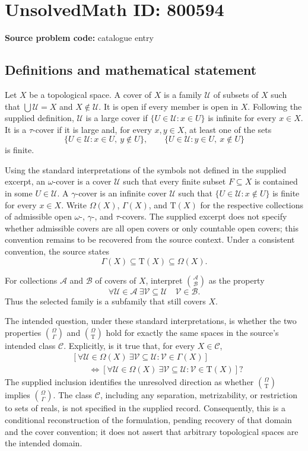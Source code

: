 \documentclass[11pt]{article}
\begin{document}
\section*{UnsolvedMath ID: 800594}
\textbf{Source problem code:} catalogue entry
\subsection{Definitions and mathematical statement}
Let \(X\) be a topological space. A cover of \(X\) is a family \(\mathcal U\) of subsets of \(X\) such that \(\bigcup\mathcal U=X\) and \(X\notin\mathcal U\). It is open if every member is open in \(X\). Following the supplied definition, \(\mathcal U\) is a large cover if \(\{U\in\mathcal U:x\in U\}\) is infinite for every \(x\in X\). It is a \(\tau\)-cover if it is large and, for every \(x,y\in X\), at least one of the sets
\[
\{U\in\mathcal U:x\in U,\ y\notin U\},\qquad
\{U\in\mathcal U:y\in U,\ x\notin U\}
\]
is finite.

Using the standard interpretations of the symbols not defined in the supplied excerpt, an \(\omega\)-cover is a cover \(\mathcal U\) such that every finite subset \(F\subseteq X\) is contained in some \(U\in\mathcal U\). A \(\gamma\)-cover is an infinite cover \(\mathcal U\) such that \(\{U\in\mathcal U:x\notin U\}\) is finite for every \(x\in X\). Write \(\Omega(X)\), \(\Gamma(X)\), and \(\mathrm T(X)\) for the respective collections of admissible open \(\omega\)-, \(\gamma\)-, and \(\tau\)-covers. The supplied excerpt does not specify whether admissible covers are all open covers or only countable open covers; this convention remains to be recovered from the source context. Under a consistent convention, the source states
\[
\Gamma(X)\subseteq\mathrm T(X)\subseteq\Omega(X).
\]

For collections \(\mathcal A\) and \(\mathcal B\) of covers of \(X\), interpret \(\binom{\mathcal A}{\mathcal B}\) as the property
\[
\forall\mathcal U\in\mathcal A\ \exists\mathcal V\subseteq\mathcal U
\quad \mathcal V\in\mathcal B.
\]
Thus the selected family is a subfamily that still covers \(X\).

The intended question, under these standard interpretations, is whether the two properties \(\binom{\Omega}{\Gamma}\) and \(\binom{\Omega}{\mathrm T}\) hold for exactly the same spaces in the source's intended class \(\mathscr C\). Explicitly, is it true that, for every \(X\in\mathscr C\),
\[
\begin{aligned}
&\left[\forall\mathcal U\in\Omega(X)\ \exists\mathcal V\subseteq\mathcal U:
\mathcal V\in\Gamma(X)\right]\\
&\qquad\Longleftrightarrow
\left[\forall\mathcal U\in\Omega(X)\ \exists\mathcal V\subseteq\mathcal U:
\mathcal V\in\mathrm T(X)\right]?
\end{aligned}
\]
The supplied inclusion identifies the unresolved direction as whether \(\binom{\Omega}{\mathrm T}\) implies \(\binom{\Omega}{\Gamma}\). The class \(\mathscr C\), including any separation, metrizability, or restriction to sets of reals, is not specified in the supplied record. Consequently, this is a conditional reconstruction of the formulation, pending recovery of that domain and the cover convention; it does not assert that arbitrary topological spaces are the intended domain.
\end{document}
